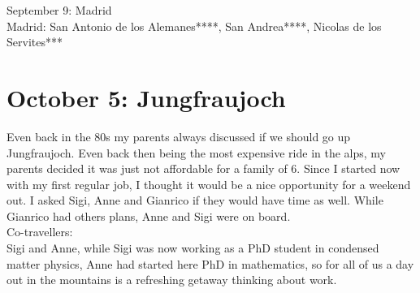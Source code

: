 September 9: Madrid\\
Madrid: San Antonio de los Alemanes****, San Andrea****, Nicolas de los Servites***


\section{October 5: Jungfraujoch}
\label{2008:Jungfrau}

Even back in the 80s my parents always discussed if we should go up Jungfraujoch. Even back then being the most expensive ride in the alps, my parents decided it was just not affordable for a family of 6. Since I started now with my first regular job, I thought it would be a nice opportunity for a weekend out. I asked Sigi, Anne and Gianrico if they would have time as well. While Gianrico had others plans, Anne and Sigi were on board.\\

Co-travellers:\\
Sigi and Anne, while Sigi was now working as a PhD student in condensed matter physics, Anne had started here PhD in mathematics, so for all of us a day out in the mountains is a refreshing getaway thinking about work.\\

